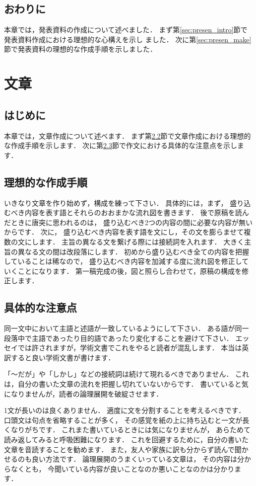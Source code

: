 \documentclass[a4j,12pt,dvipdfmx,oneside]{jsbook}
\theoremstyle{definition}
\begin{document}
\section{おわりに}\label{sec:presen_summary}
本章では，発表資料の作成について述べました．
まず第\ref{sec:presen_intro}節で発表資料作成における理想的な心構えを示し
ました．
次に第\ref{sec:presen_make}節で発表資料の理想的な作成手順を示しました．
%
%
%
\chapter{文章}\label{chap:statement}
%
%
%
\section{はじめに}\label{sec:statement_intro}
本章では，文章作成について述べます．
まず第\ref{sec:statement_philosophy}節で文章作成における理想的な作成手順を示します．
次に第\ref{sec:statement_remark}節で作文における具体的な注意点を示します．
%
%
%
\section{理想的な作成手順}\label{sec:statement_philosophy}
%
%
%
いきなり文章を作り始めず，構成を練って下さい．
具体的には，まず，
盛り込むべき内容を表す語とそれらのおおまかな流れ図を書きます．
後で原稿を読んだときに唐突に思われるのは，
盛り込むべき2つの内容の間に必要な内容が無いからです．
次に，
盛り込むべき内容を表す語を文にし，その文を膨らませて複数の文にします．
主旨の異なる文を繋げる際には接続詞を入れます．
大きく主旨の異なる文の間は改段落にします．
初めから盛り込むべき全ての内容を把握していることは稀なので，
盛り込むべき内容を加減する度に流れ図を修正していくことになります．
第一稿完成の後，図と照らし合わせて，原稿の構成を修正します．
%
%
%
\section{具体的な注意点}\label{sec:statement_remark}
%
%
%
同一文中において主語と述語が一致しているようにして下さい．
ある語が同一段落中で主語であったり目的語であったり変化することを避けて下さい．
エッセイでは許されますが，学術文書でこれをやると読者が混乱します．
本当は英訳すると良い学術文書が書けます．

「〜だが」や「しかし」などの接続詞は続けて現れるべきでありません．
これは，自分の書いた文章の流れを把握し切れていないからです．
書いていると気になりませんが，読者の論理展開を破綻させます．

1文が長いのは良くありません．
適度に文を分割することを考えるべきです．
口頭文は句点を省略することが多く，
その感覚を紙の上に持ち込むと一文が長くなりがちです．
これまた書いているときには気になりませんが，
あらためて読み返してみると呼吸困難になります．
これを回避するために，自分の書いた文章を音読することを勧めます．
また，友人や家族に訳も分からず読んで聞かせるのも良い方法です．
論理展開のうまくいっている文章は，
その内容は分からなくとも，
今聞いている内容が良いことなのか悪いことなのかは分かります．
\end{document}
